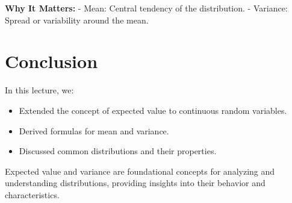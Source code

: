 \documentclass{article}
\begin{document}
\textbf{Why It Matters:}
- Mean: Central tendency of the distribution.
- Variance: Spread or variability around the mean.

\section*{Conclusion}

In this lecture, we:
\begin{itemize}
  \item Extended the concept of expected value to continuous random variables.
  \item Derived formulas for mean and variance.
  \item Discussed common distributions and their properties.
\end{itemize}

Expected value and variance are foundational concepts for analyzing and understanding distributions, providing insights into their behavior and characteristics.
\end{document}
